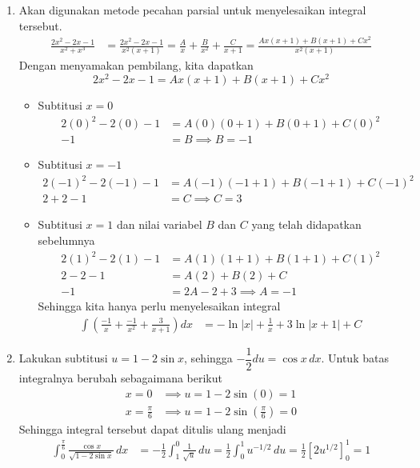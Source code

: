 \documentclass[11pt,openany,a4paper]{article}
\begin{document}
\begin{enumerate}
        \begin{align*}
          \int \ln(t^2 + 1) \, dt &= \boxed{t \ln(t^2 + 1) - 2t + 2\tan^{-1} t + C}
        \end{align*}
        \item Akan digunakan metode pecahan parsial untuk menyelesaikan integral tersebut. 
        \begin{align*}
          \frac{2x^2 - 2x - 1}{x^2 + x^3} &= \frac{2x^2 - 2x - 1}{x^2 (x+ 1)} = \frac{A}{x} + \frac{B}{x^2} + \frac{C}{x+1}= \frac{Ax(x + 1) + B(x+1) + Cx^2}{x^2(x+1)} 
        \end{align*}
        Dengan menyamakan pembilang, kita dapatkan
        \[
          2x^2 - 2x - 1 = Ax(x + 1) + B(x+1) + Cx^2
        \]
        \begin{itemize}
          \item Subtitusi $x=0$
          \begin{align*}
            2(0)^2 - 2(0) - 1 &= A(0)(0 + 1) + B(0+1) + C(0)^2 \\
            -1 &= B \implies B = -1
          \end{align*}
          \item Subtitusi $x=-1$
          \begin{align*}
            2(-1)^2 - 2(-1) - 1 &= A(-1)(-1 + 1) + B(-1+1) + C(-1)^2 \\
            2 + 2 - 1 &= C \implies C = 3
          \end{align*}
          \item Subtitusi $x=1$ dan nilai variabel $B$ dan $C$ yang telah didapatkan sebelumnya
          \begin{align*}
            2(1)^2 - 2(1) - 1 &= A(1)(1 + 1) + B(1+1) + C(1)^2 \\
            2 - 2 - 1 &= A(2) + B(2) + C \\
            -1 &= 2A - 2 + 3 \implies A = -1
          \end{align*}
          Sehingga kita hanya perlu menyelesaikan integral
          \begin{align*}
            \int \left(\frac{-1}{x} + \frac{-1}{x^2} + \frac{3}{x+1}\right)dx &= \boxed{-\ln|x| + \frac{1}{x} + 3\ln|x+1| + C}
          \end{align*}
        \end{itemize}
        \item Lakukan subtitusi $u = 1 - 2\sin x$, sehingga $-\dfrac{1}{2}du = \cos x \, dx$. Untuk batas integralnya berubah sebagaimana berikut
        \begin{align*}
          x = 0 &\implies u = 1 - 2\sin(0) = 1 \\
          x = \frac{\pi}{6} &\implies u = 1 - 2\sin\left(\frac{\pi}{6}\right) = 0
        \end{align*}
        Sehingga integral tersebut dapat ditulis ulang menjadi
        \begin{align*}
          \int_0^{\frac{\pi}{6}} \frac{\cos x}{\sqrt{1 - 2 \sin x}} \, dx &= -\frac{1}{2}\int_1^0 \frac{1}{\sqrt{u}}\,du = \frac{1}{2}\int_0^1 u^{-1/2}\,du = \frac{1}{2}\left[2u^{1/2}\right]_0^1 = \boxed{1}
        \end{align*}
    \end{enumerate}
\end{document}
